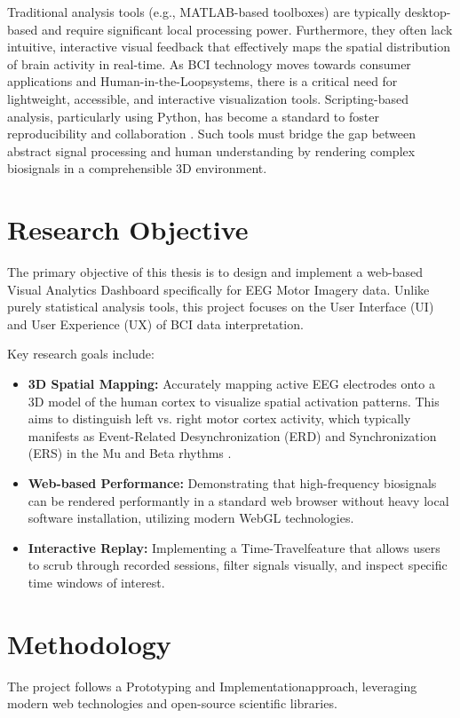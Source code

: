 Traditional analysis tools (e.g., MATLAB-based toolboxes) are typically desktop-based and require significant local processing power. Furthermore, they often lack intuitive, interactive visual feedback that effectively maps the spatial distribution of brain activity in real-time. As BCI technology moves towards consumer applications and \glqq Human-in-the-Loop\grqq \space systems, there is a critical need for lightweight, accessible, and interactive visualization tools. Scripting-based analysis, particularly using Python, has become a standard to foster reproducibility and collaboration \cite{gramfort2013}. Such tools must bridge the gap between abstract signal processing and human understanding by rendering complex biosignals in a comprehensible 3D environment.

\clearpage

\section{Research Objective}
The primary objective of this thesis is to design and implement a web-based Visual Analytics Dashboard specifically for EEG Motor Imagery data. Unlike purely statistical analysis tools, this project focuses on the User Interface (UI) and User Experience (UX) of BCI data interpretation.

Key research goals include:
\begin{itemize}
    \item \textbf{3D Spatial Mapping:} Accurately mapping active EEG electrodes onto a 3D model of the human cortex to visualize spatial activation patterns. This aims to distinguish left vs. right motor cortex activity, which typically manifests as Event-Related Desynchronization (ERD) and Synchronization (ERS) in the Mu and Beta rhythms \cite{abiri2019}.
    \item \textbf{Web-based Performance:} Demonstrating that high-frequency biosignals can be rendered performantly in a standard web browser without heavy local software installation, utilizing modern WebGL technologies.
    \item \textbf{Interactive Replay:} Implementing a \glqq Time-Travel\grqq \space feature that allows users to scrub through recorded sessions, filter signals visually, and inspect specific time windows of interest.
\end{itemize}

\clearpage

\section{Methodology}
The project follows a \glqq Prototyping and Implementation\grqq \space approach, leveraging modern web technologies and open-source scientific libraries.

